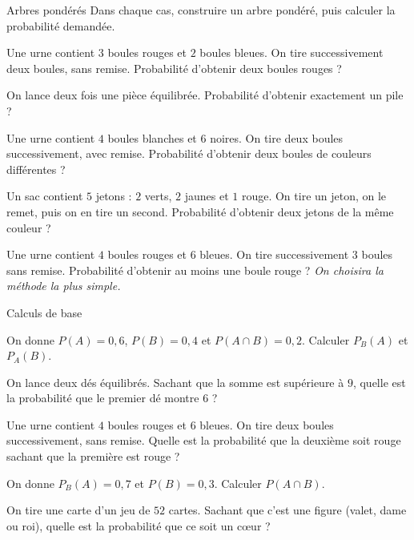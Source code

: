 \exercices
{}

\begin{exercice}[1]{Arbres pondérés}
Dans chaque cas, construire un arbre pondéré, puis calculer la probabilité demandée.
\begin{questions}
  \item Une urne contient $3$ boules rouges et $2$ boules bleues. On tire successivement deux boules, sans remise. Probabilité
    d'obtenir deux boules rouges ?
  \item On lance deux fois une pièce équilibrée. Probabilité d'obtenir exactement un pile ?
  \item Une urne contient $4$ boules blanches et $6$ noires. On tire deux boules successivement, avec remise. Probabilité
    d'obtenir deux boules de couleurs différentes ?
  \item Un sac contient $5$ jetons : $2$ verts, $2$ jaunes et $1$ rouge. On tire un jeton, on le remet, puis on en tire un second.
    Probabilité d'obtenir deux jetons de la même couleur ?
  \item Une urne contient $4$ boules rouges et $6$ bleues. On tire successivement $3$ boules sans remise. Probabilité d'obtenir au
    moins une boule rouge ? \emph{On choisira la méthode la plus simple.}
\end{questions}
\end{exercice}

\begin{exercice}[1]{Calculs de base}
\begin{questions}
  \item On donne $P(A)=0{,}6$, $P(B)=0{,}4$ et $P(A\cap B)=0{,}2$. Calculer $P_B(A)$ et $P_A(B)$.
  \item On lance deux dés équilibrés. Sachant que la somme est supérieure à $9$, quelle est la probabilité que le premier dé
    montre $6$ ?
  \item Une urne contient $4$ boules rouges et $6$ bleues. On tire deux boules successivement, sans remise. Quelle est la
    probabilité que la deuxième soit rouge sachant que la première est rouge ?
  \item On donne $P_B(A)=0{,}7$ et $P(B)=0{,}3$. Calculer $P(A\cap B)$.
  \item On tire une carte d'un jeu de $52$ cartes. Sachant que c'est une figure (valet, dame ou roi), quelle est la probabilité
    que ce soit un cœur ?
\end{questions}
\end{exercice}


